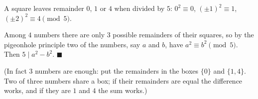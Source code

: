A square leaves remainder $0$, $1$ or $4$ when divided by $5$: $0^2\equiv0$, $(\pm1)^2\equiv1$, $(\pm2)^2\equiv4\pmod5$.

Among $4$ numbers there are only $3$ possible remainders of their squares, so by the pigeonhole principle two of the numbers, say $a$ and $b$, have $a^2\equiv b^2\pmod5$. Then $5\mid a^2-b^2$. $\blacksquare$

(In fact $3$ numbers are enough: put the remainders in the boxes $\{0\}$ and $\{1,4\}$. Two of three numbers share a box; if their remainders are equal the difference works, and if they are $1$ and $4$ the sum works.)
